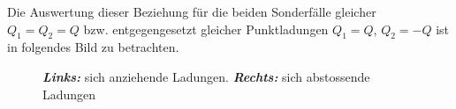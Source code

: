 Die Auswertung dieser Beziehung für die beiden Sonderfälle gleicher $Q_1=Q_2=Q$ bzw. entgegengesetzt gleicher Punktladungen $Q_1=Q$, $Q_2=-Q$ ist in folgendes Bild zu betrachten.
\begin{figure}[H]
\centering
{}
\caption{\textbf{\textit{Links:}} sich anziehende Ladungen. \textbf{\textit{Rechts:}} sich abstossende Ladungen}
\label{fig_Il}
\end{figure}
